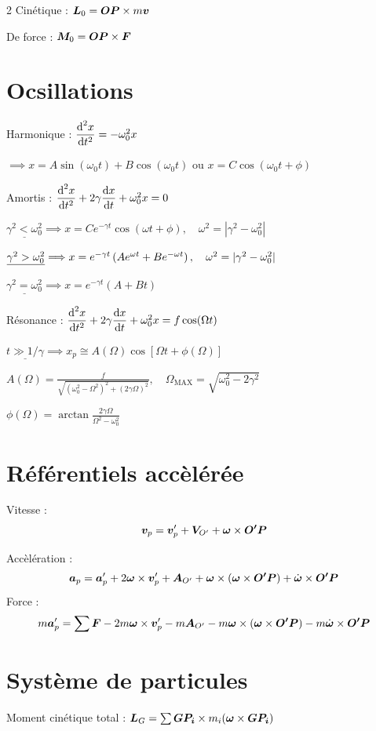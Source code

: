 \documentclass[10pt,a4paper,twoside]{article}
\begin{document}
\begin{multicols}{2}
Cinétique : $\bf{L}_{0} = \bf{OP} \times  m \bf{v}$

De force : $\bf{M}_{0} = \bf{OP} \times  \bf{F}$

\section*{Ocsillations}
Harmonique : $\frac{\d^{2} x}{\d t^{2}} = -\omega_0^2 x$


$\implies x = A \sin (\omega_0 t) + B \cos (\omega_0 t) $ ou $ x = C \cos (\omega_0 t + \phi)
$


Amortis : $\frac{\d^{2} x}{\d t^{2}} + 2\gamma \frac{\d x}{\d t}  + \omega_0^2 x = 0$

$\underline{\gamma^2 < \omega_0^2} \implies x = C e^{-\gamma t} \cos (\omega t + \phi),\quad  \omega^2 = |\gamma^2 - \omega_0^2|$

$\underline{\gamma^2 > \omega_0 ^2} \implies x = e^{-\gamma t}\l( A e^{\omega t} + B e^{- \omega t} \r) ,\quad  \omega^2 = |\gamma^2 - \omega_0^2|$

$\underline{\gamma^2 = \omega_0^2} \implies x = e ^{-\gamma t} (A + B t)$

Résonance : $\frac{\d^{2} x}{\d t^{2}} + 2\gamma \frac{\d x}{\d t}  + \omega_0^2 x = f \cos (\Omega t)$


$\underline{t \gg 1 / \gamma} \implies x_{p} \cong A(\Omega) \cos \left[ \Omega t + \phi(\Omega) \right] $

$A(\Omega) = \frac{f}{\sqrt{(\omega_0^2 - \Omega^2)^2 + (2\gamma\Omega)^2} },\quad  \Omega_{\text{MAX}} = \sqrt{\omega_0^2 - 2 \gamma^2} 
$

$\phi(\Omega) = \arctan \frac{2\gamma\Omega}{\Omega^2 - \omega_0^2}$

\section*{Référentiels accèlérée}

Vitesse : 
\[
\bf{v}_{p} = \bf{v}'_{p} + \bf{V}_{O'} + \bf{\omega} \times  \bf{O'P}
\] 

Accèlération : 
\[
\bf{a}_{p} = \bf{a}'_{p} + 2 \bf{\omega}  \times \bf{v}'_{p} + \bf{A}_{O'} + \bf{\omega}\times (\bf{\omega} \times  \bf{O'P}) + \dot{\bf{\omega}} \times  \bf{O'P}
\] 
Force :
\[
m \bf{a}'_{p} = \sum\bf{F} -  2m \bf{\omega}  \times \bf{v}'_{p} - m\bf{A}_{O'} - m\bf{\omega}\times (\bf{\omega} \times  \bf{O'P}) - m\dot{\bf{\omega}} \times  \bf{O'P}
\] 
\section*{Système de particules}
Moment cinétique total : $\bf{L}_{G} = \sum \bf{GP_{i}} \times  m_{i} (\bf{\omega} \times \bf{GP_{i}})$


\end{multicols}
\end{document}
